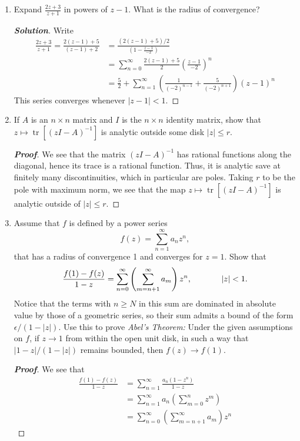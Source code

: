 \documentclass[12pt,leqno]{article}
\theoremstyle{definition}
\newcommand{\tr}{\operatorname{tr}}
\newenvironment{Proof}{\begin{proof}[\textnormal{\textbf{Proof}}]}{\end{proof}}
\newenvironment{Solution}{\begin{proof}[\textnormal{\textbf{Solution}}]}{\end{proof}}
\begin{document}
\begin{enumerate}
\begin{Proof}
  \end{Proof}
 \item Expand $\frac{2z+3}{z+1}$ in powers of $z-1$. What is the radius of convergence?
  \begin{Solution}
   Write \begin{align*}\frac{2z+3}{z+1}=\frac{2(z-1)+5}{(z-1)+2}&=\frac{(2(z-1)+5)/2}{(1-\frac{z-1}{-2})}\\&=\sum_{n=0}^{\infty}\frac{2(z-1)+5}{2}\left(\frac{z-1}{-2}\right)^n\\&=\frac{5}{2}+\sum_{n=1}^{\infty}\left(\frac{1}{(-2)^{n-1}}+\frac{5}{(-2)^{n+1}}\right)(z-1)^n\end{align*} This series converges whenever $|z-1|<1$. 
  \end{Solution}
 \item If $A$ is an $n\times n$ matrix and $I$ is the $n\times n$ identity matrix, show that $z\mapsto\tr[(zI-A)^{-1}]$ is analytic outside some disk $|z|\leq r$.
  \begin{Proof}
   We see that the matrix $(zI-A)^{-1}$ has rational functions along the diagonal, hence its trace is a rational function. Thus, it is analytic save at finitely many discontinuities, which in particular are poles. Taking $r$ to be the pole with maximum norm, we see that the map $z\mapsto\tr[(zI-A)^{-1}]$ is analytic outside of $|z|\leq r$.
  \end{Proof}
 \item Assume that $f$ is defined by a power series \[f(z)=\sum_{n=1}^{\infty}a_nz^n,\] that has a radius of convergence 1 and converges for $z=1$. Show that \[\frac{f(1)-f(z)}{1-z}=\sum_{n=0}^{\infty}\left(\sum_{m=n+1}^{\infty}a_m\right)z^n,\hskip.5in|z|<1.\] Notice that the terms with $n\geq N$ in this sum are dominated in absolute value by those of a geometric series, so their sum admits a bound of the form $\epsilon/(1-|z|)$. Use this to prove \textit{Abel's Theorem:} Under the given assumptions on $f$, if $z\to1$ from within the open unit disk, in such a way that $|1-z|/(1-|z|)$ remains bounded, then $f(z)\to f(1)$.
  \begin{Proof}
   We see that \begin{align*}\frac{f(1)-f(z)}{1-z}&=\sum_{n=1}^{\infty}\frac{a_n(1-z^n)}{1-z}\\&=\sum_{n=1}^{\infty}a_n\left(\sum_{m=0}^nz^m\right)\\&=\sum_{n=0}^{\infty}\left(\sum_{m=n+1}^{\infty}a_m\right)z^n\end{align*}
  \end{Proof}

\end{enumerate}
\end{document}
